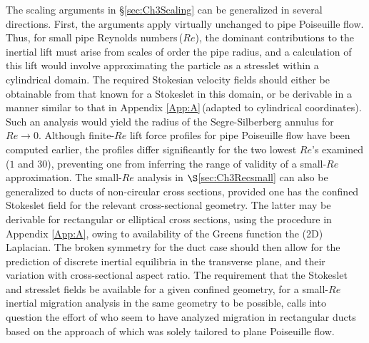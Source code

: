 \documentclass{jfm}
\begin{document}
The scaling arguments in \S\ref{sec:Ch3Scaling} can be generalized in several directions. First, the arguments apply virtually unchanged to pipe Poiseuille flow. Thus, for small pipe Reynolds numbers\,($Re$), the dominant contributions to the inertial lift must arise from scales of order the pipe radius, and a calculation of this lift would involve approximating the particle as a stresslet within a cylindrical domain. The required Stokesian velocity fields should either be obtainable from that known for a Stokeslet in this domain\citep{liron1978stokes}, or be derivable in a manner similar to that in Appendix \ref{App:A}\,(adapted to cylindrical coordinates). Such an analysis would yield the radius of the Segre-Silberberg annulus for $Re\to0$. Although finite-$Re$ lift force profiles for pipe Poiseuille flow have been computed earlier\citep{matas2009}, the profiles differ significantly for the two lowest $Re$'s examined\,($1$ and $30$), preventing one from inferring the range of validity of a small-$Re$ approximation. The small-$Re$ analysis in $\S$\ref{sec:Ch3Recsmall} can also be generalized to ducts of non-circular cross sections, provided one has the confined Stokeslet field for the relevant cross-sectional geometry. The latter may be derivable for rectangular or elliptical cross sections, using the procedure in Appendix \ref{App:A}, owing to availability of the Greens function the (2D)\,Laplacian. The broken symmetry for the duct case should then allow for the prediction of discrete inertial equilibria in the transverse plane, and their variation with cross-sectional aspect ratio. The requirement that the Stokeslet and stresslet fields be available for a given confined geometry, for a small-$Re$ inertial migration analysis in the same geometry to be possible, calls into question the effort of \cite{roper2015} who seem to have analyzed migration in rectangular ducts based on the approach of \cite{holeal1974} which was solely tailored to plane Poiseuille flow.
\end{document}
